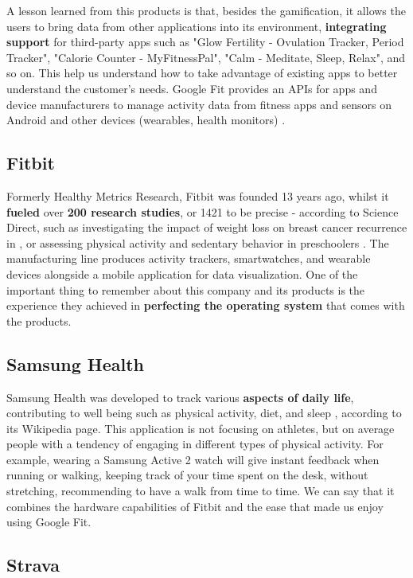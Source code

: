 A lesson learned from this products is that, besides the gamification, it allows the users to bring data from other applications into its environment, \textbf{integrating support} for third-party apps such as "Glow Fertility - Ovulation Tracker, Period Tracker", "Calorie Counter - MyFitnessPal", "Calm - Meditate, Sleep, Relax", and so on. This help us understand how to take advantage of existing apps to better understand the customer's needs. Google Fit provides an APIs for apps and device manufacturers to manage activity data from fitness apps and sensors on Android and other devices (wearables, health monitors) \cite{wikigf}.

\subsection*{Fitbit}

Formerly Healthy Metrics Research, Fitbit was founded 13 years ago, whilst it \textbf{fueled} over \textbf{200 research studies}, or 1421 to be precise - according to Science Direct, such as investigating the impact of weight loss on breast cancer recurrence in \cite{obsfit}, or assessing physical activity and sedentary behavior in preschoolers \cite{BYUN201835}. The manufacturing line produces activity trackers, smartwatches, and wearable devices alongside a mobile application for data visualization. One of the important thing to remember about this company and its products is the experience they achieved in \textbf{perfecting the operating system} that comes with the products.

\subsection*{Samsung Health}

Samsung Health was developed to track various \textbf{aspects of daily life}, contributing to well being such as physical activity, diet, and sleep \cite{sahl}, according to its Wikipedia page. This application is not focusing on athletes, but on average people with a tendency of engaging in different types of physical activity. For example, wearing a Samsung Active 2 watch will give instant feedback when running or walking, keeping track of your time spent on the desk, without stretching, recommending to have a walk from time to time. We can say that it combines the hardware capabilities of Fitbit and the ease that made us enjoy using Google Fit.

\subsection*{Strava}

